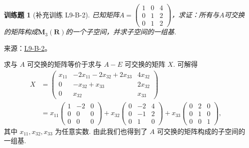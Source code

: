 \documentclass[12pt,fontset=fandol]{ctexart}
\newtheorem{exercise}{训练题}[section]
\begin{document}
\begin{exercise}[补充训练 L9-B-2]\label{prob:L9-B-2}
已知矩阵$A=\begin{pmatrix}
                1 & 0 & 4 \\ 0 & 1 & 2 \\ 0 & 1 & 2
            \end{pmatrix}$，求证：所有与$A$可交换的矩阵构成$\mathbf{M}_3(\mathbf{R})$的一个子空间，并求子空间的一组基.
\end{exercise}
\noindent 来源：\href{https://github.com/yhwu-is/Linear-Algebra-Left-Undone/blob/new/%E8%AE%B2%E4%B9%89/%E4%B8%93%E9%A2%98/9%20%E7%9F%A9%E9%98%B5%E8%BF%90%E7%AE%97%E8%BF%9B%E9%98%B6.tex}{L9-B-2}。
\begin{solve}
求与 $ A $ 可交换的矩阵等价于求与 $ A - E $ 可交换的矩阵 $ X $. 可解得
            \begin{align*}
                X & = \begin{pmatrix}
                            x_{11} & -2x_{11} - 2x_{32} + 2x_{33} & 4x_{32} \\
                            0      & -x_{32} + x_{33}             & 2x_{32} \\
                            0      & x_{32}                       & x_{33}
                        \end{pmatrix} \\
                    & = x_{11} \begin{pmatrix}
                                1 & -2 & 0 \\
                                0 & 0  & 0 \\
                                0 & 0  & 0
                            \end{pmatrix}
                + x_{32} \begin{pmatrix}
                            0 & -2 & 4 \\
                            0 & -1 & 2 \\
                            0 & 1  & 0
                        \end{pmatrix}
                + x_{33} \begin{pmatrix}
                            0 & 2 & 0 \\
                            0 & 1 & 0 \\
                            0 & 0 & 1
                        \end{pmatrix},
            \end{align*}
            其中 $ x_{11}, x_{32}, x_{33} $ 为任意实数. 由此我们也得到了 $ A $ 可交换的矩阵构成的子空间的一组基.
\end{solve}
\end{document}
